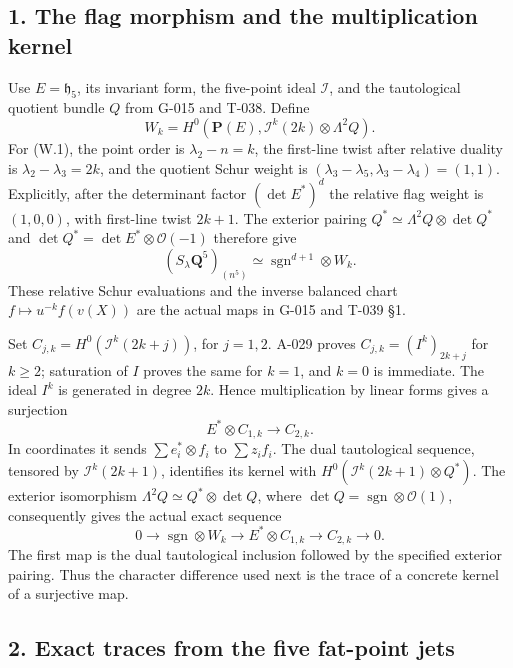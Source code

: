 \documentclass[
  10pt,
]{article}
\begin{document}
\subsection{1. The flag morphism and the multiplication
kernel}\label{the-flag-morphism-and-the-multiplication-kernel}

Use \(E=\mathfrak h_5\), its invariant form, the five-point ideal
\(\mathcal I\), and the tautological quotient bundle \(Q\) from G-015
and T-038. Define \[
W_k=H^0(\mathbf P(E),\mathcal I^k(2k)\otimes\Lambda^2Q).
\tag{W.3}
\] For (W.1), the point order is \(\lambda_2-n=k\), the first-line twist
after relative duality is \(\lambda_2-\lambda_3=2k\), and the quotient
Schur weight is \((\lambda_3-\lambda_5,\lambda_3-\lambda_4)=(1,1)\).
Explicitly, after the determinant factor \((\det E^*)^d\) the relative
flag weight is \((1,0,0)\), with first-line twist \(2k+1\). The exterior
pairing \(Q^*\simeq\Lambda^2Q\otimes\det Q^*\) and
\(\det Q^*=\det E^*\otimes\mathcal O(-1)\) therefore give \[
(S_\lambda\mathbf Q^5)_{(n^5)}\simeq\operatorname{sgn}^{d+1}\otimes W_k.
\tag{W.4}
\] These relative Schur evaluations and the inverse balanced chart
\(f\mapsto u^{-k}f(v(X))\) are the actual maps in G-015 and T-039 §1.

Set \(C_{j,k}=H^0(\mathcal I^k(2k+j))\), for \(j=1,2\). A-029 proves
\(C_{j,k}=(I^k)_{2k+j}\) for \(k\ge2\); saturation of \(I\) proves the
same for \(k=1\), and \(k=0\) is immediate. The ideal \(I^k\) is
generated in degree \(2k\). Hence multiplication by linear forms gives a
surjection \[
E^*\otimes C_{1,k}\longrightarrow C_{2,k}.
\tag{W.5}
\] In coordinates it sends \(\sum e_i^*\otimes f_i\) to \(\sum z_if_i\).
The dual tautological sequence, tensored by \(\mathcal I^k(2k+1)\),
identifies its kernel with \(H^0(\mathcal I^k(2k+1)\otimes Q^*)\). The
exterior isomorphism \(\Lambda^2Q\simeq Q^*\otimes\det Q\), where
\(\det Q=\operatorname{sgn}\otimes\mathcal O(1)\), consequently gives
the actual exact sequence \[
\boxed{0\longrightarrow\operatorname{sgn}\otimes W_k
\longrightarrow E^*\otimes C_{1,k}
\longrightarrow C_{2,k}\longrightarrow0.}
\tag{W.6}
\] The first map is the dual tautological inclusion followed by the
specified exterior pairing. Thus the character difference used next is
the trace of a concrete kernel of a surjective map.

\subsection{2. Exact traces from the five fat-point
jets}\label{exact-traces-from-the-five-fat-point-jets}
\end{document}
